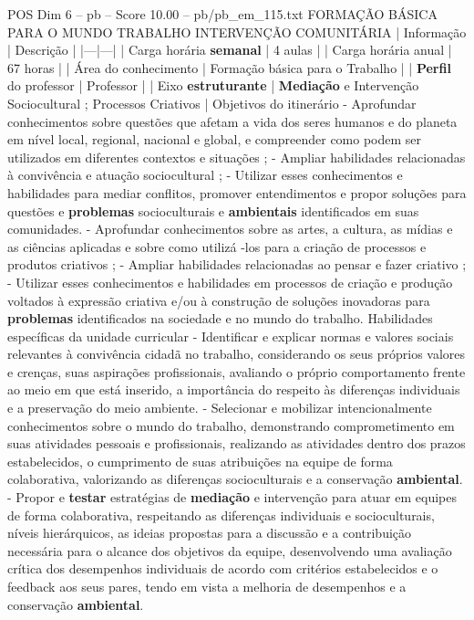 \begin{textsample}{POS Dim 6 – pb – Score 10.00 – pb/pb\_em\_115.txt}  \label{ex:f6_pos_205}
FORMAÇÃO BÁSICA PARA O MUNDO TRABALHO INTERVENÇÃO COMUNITÁRIA | Informação | Descrição | |---|---| | Carga horária \textbf{semanal} | 4 aulas | | Carga horária anual | 67 horas | | Área do conhecimento | Formação básica para o Trabalho | | \textbf{Perfil} do professor | Professor | | Eixo \textbf{estruturante} | \textbf{Mediação} e Intervenção Sociocultural ; Processos Criativos | Objetivos do itinerário - Aprofundar conhecimentos sobre questões que afetam a vida dos seres humanos e do planeta em nível local, regional, nacional e global, e compreender como podem ser utilizados em diferentes contextos e situações ; - Ampliar habilidades relacionadas à convivência e atuação sociocultural ; - Utilizar esses conhecimentos e habilidades para mediar conflitos, promover entendimentos e propor soluções para questões e \textbf{problemas} socioculturais e \textbf{ambientais} identificados em suas comunidades. - Aprofundar conhecimentos sobre as artes, a cultura, as mídias e as ciências aplicadas e sobre como utilizá -los para a criação de processos e produtos criativos ; - Ampliar habilidades relacionadas ao pensar e fazer criativo ; - Utilizar esses conhecimentos e habilidades em processos de criação e produção voltados à expressão criativa e/ou à construção de soluções inovadoras para \textbf{problemas} identificados na sociedade e no mundo do trabalho.
Habilidades específicas da unidade curricular - Identificar e explicar normas e valores sociais relevantes à convivência cidadã no trabalho, considerando os seus próprios valores e crenças, suas aspirações profissionais, avaliando o próprio comportamento frente ao meio em que está inserido, a importância do respeito às diferenças individuais e a preservação do meio ambiente. - Selecionar e mobilizar intencionalmente conhecimentos sobre o mundo do trabalho, demonstrando comprometimento em suas atividades pessoais e profissionais, realizando as atividades dentro dos prazos estabelecidos, o cumprimento de suas atribuições na equipe de forma colaborativa, valorizando as diferenças socioculturais e a conservação \textbf{ambiental}. - Propor e \textbf{testar} estratégias de \textbf{mediação} e intervenção para atuar em equipes de forma colaborativa, respeitando as diferenças individuais e socioculturais, níveis hierárquicos, as ideias propostas para a discussão e a contribuição necessária para o alcance dos objetivos da equipe, desenvolvendo uma avaliação crítica dos desempenhos individuais de acordo com critérios estabelecidos e o feedback aos seus pares, tendo em vista a melhoria de desempenhos e a conservação \textbf{ambiental}.

\end{textsample}
